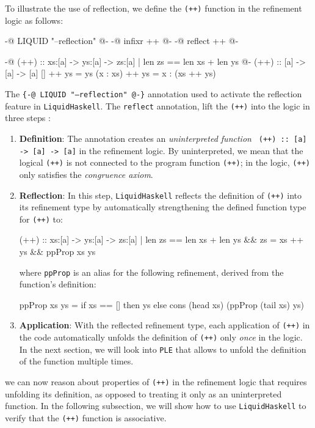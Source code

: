 To illustrate the use of reflection, we define the \texttt{(++)} function in the refinement logic as follows:

\begin{code}
	{-@ LIQUID "--reflection" @-}
	{-@ infixr ++ @-}
	{-@ reflect ++ @-}

	{-@ (++) :: xs:[a] -> ys:[a] -> { zs:[a] | len zs == len xs + len ys } @-}
	(++) :: [a] -> [a] -> [a]
	[] ++ ys = ys
	(x : xs) ++ ys = x : (xs ++ ys)
\end{code}
The \texttt{\{-@ LIQUID "--reflection" @-\}} annotation used to activate the reflection feature in \texttt{LiquidHaskell}.
The \texttt{reflect} annotation, lift the \texttt{(++)} into the logic in three steps \cite{vazou2018}:
\begin{enumerate}
	\item \textbf{Definition}: The annotation creates an \textit{uninterpreted function} \texttt{
	      (++) :: [a] -> [a] -> [a]} in the refinement logic. By uninterpreted, we mean that the logical \texttt{(++)} is
	      not connected to the program function \texttt{(++)}; in the logic, \texttt{(++)} only satisfies the \textit{congruence axiom}.
	\item \textbf{Reflection}: In this step, \texttt{LiquidHaskell} reflects the definition of \texttt{(++)} into its refinement type
	      by automatically strengthening the defined function type for \texttt{(++)} to:


	      \begin{code}
		      (++) :: xs:[a] -> ys:[a]
		      -> { zs:[a] | len zs == len xs + len ys
		      && zs = xs ++ ys
		      && ppProp xs ys }
	      \end{code}
	      where \texttt{ppProp} is an alias for the following refinement, derived from the function's definition:
	      \begin{code}
		      ppProp xs ys = if xs == [] then ys
		      else cons (head xs) (ppProp (tail xs) ys)

	      \end{code}
	\item \textbf{Application}: With the reflected refinement type, each application of \texttt{(++)}
	      in the code automatically unfolds the definition of \texttt{(++)} only \textit{once} in the logic. In the
	      next section, we will look into \texttt{PLE} that allows to unfold the definition of the function multiple times.
\end{enumerate}
we can now reason about properties of \texttt{(++)} in the refinement logic that requires unfolding its definition,
as opposed to treating it only as an uninterpreted function.
In the following subsection,
we will show how to use \texttt{LiquidHaskell} to verify that the \texttt{(++)} function is associative.

